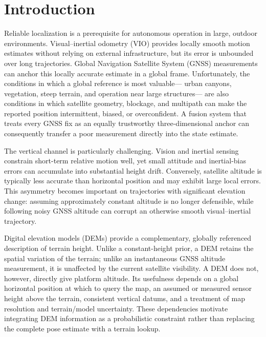
\providecommand{\method}{Terrain-SLAM}
\providecommand{\datasetnames}{\textbf{[DATASET NAMES]}}
\providecommand{\TODO}[1]{\textbf{[TODO: #1]}}

\section{Introduction}
\label{sec:introduction}

Reliable localization is a prerequisite for autonomous operation in large,
outdoor environments. Visual--inertial odometry (VIO) provides locally smooth
motion estimates without relying on external infrastructure, but its error is
unbounded over long trajectories. Global Navigation Satellite System (GNSS)
measurements can anchor this locally accurate estimate in a global frame.
Unfortunately, the conditions in which a global reference is most valuable---
urban canyons, vegetation, steep terrain, and operation near large structures---
are also conditions in which satellite geometry, blockage, and multipath can
make the reported position intermittent, biased, or overconfident. A fusion
system that treats every GNSS fix as an equally trustworthy three-dimensional
anchor can consequently transfer a poor measurement directly into the state
estimate.

The vertical channel is particularly challenging. Vision and inertial sensing
constrain short-term relative motion well, yet small attitude and inertial-bias
errors can accumulate into substantial height drift. Conversely, satellite
altitude is typically less accurate than horizontal position and may exhibit
large local errors. This asymmetry becomes important on trajectories with
significant elevation change: assuming approximately constant altitude is no
longer defensible, while following noisy GNSS altitude can corrupt an otherwise
smooth visual--inertial trajectory.

Digital elevation models (DEMs) provide a complementary, globally referenced
description of terrain height. Unlike a constant-height prior, a DEM retains
the spatial variation of the terrain; unlike an instantaneous GNSS altitude
measurement, it is unaffected by the current satellite visibility. A DEM does
not, however, directly give platform altitude. Its usefulness depends on a
global horizontal position at which to query the map, an assumed or measured
sensor height above the terrain, consistent vertical datums, and a treatment of
map resolution and terrain/model uncertainty. These dependencies motivate
integrating DEM information as a probabilistic constraint rather than replacing
the complete pose estimate with a terrain lookup.

